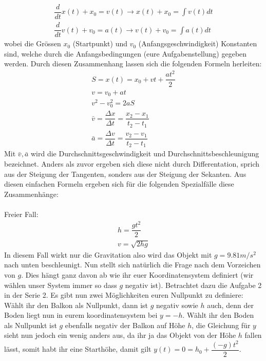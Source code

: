 \documentclass[12pt]{article}
\begin{document}
\begin{equation}
\begin{split}
\dfrac{d}{dt} x(t) + x_0 = v(t) \rightarrow x(t) + x_0 = \int v(t) dt \\
\dfrac{d}{dt} v(t)+v_0 = a(t) \rightarrow v(t)+v_0 = \int a(t) dt
\end{split}
\end{equation}
wobei die Grössen $x_0$ (Startpunkt) und $v_0$ (Anfangsgeschwindigkeit) Konstanten sind, welche durch die Anfangsbedingungen (eure Aufgabenstellung) gegeben werden. Durch diesen Zusammenhang lassen sich die folgenden Formeln herleiten:
\begin{equation}
\begin{split}
S = x(t) = x_0 + vt+\dfrac{at^2}{2} \\
v = v_0 + at \\
v^2-v_0^2 = 2aS \\
\bar{v} = \dfrac{\Delta x}{\Delta t} = \dfrac{x_2-x_1}{t_2-t_1} \\
\bar{a} = \dfrac{\Delta v}{\Delta t} = \dfrac{v_2-v_1}{t_2-t_1}
\end{split}
\end{equation}
Mit $\bar{v}, \bar{a}$ wird die Durchschnittsgeschwindigkeit und Durchschnittsbeschleunigung bezeichnet. Anders als zuvor ergeben sich diese nicht durch Differentation, sprich aus der Steigung der Tangenten, sonders aus der Steigung der Sekanten.
Aus diesen einfachen Formeln ergeben sich für die folgenden Spezialfälle diese Zusammenhänge:\\
\\ Freier Fall:
\begin{equation}
\begin{split}
h = \dfrac{gt^2}{2} \\
v = \sqrt{2hg}
\end{split}
\end{equation}
In diesem Fall wirkt nur die Gravitation also wird das Objekt mit $g = 9.81 m/s^2$ nach unten beschleunigt. Nun stellt sich natürlich die Frage nach dem Vorzeichen von $g$. Dies hängt ganz davon ab wie ihr euer Koordinatensystem definiert  (wir wählen unser System immer so dass $g$ negativ ist). Betrachtet dazu die Aufgabe 2 in der Serie 2. Es gibt nun zwei Möglichkeiten euren Nullpunkt zu definiere: Wählt ihr den Balkon als Nullpunkt, dann ist $g$ negativ sowie $h$ auch, denn der Boden liegt nun in eurem koordinatensystem bei $y=-h$. Wählt ihr den Boden als Nullpunkt ist $g$ ebenfalls negativ der Balkon auf Höhe $h$, die Gleichung für $y$ sieht nun jedoch ein wenig anders aus, da ihr ja das Objekt von der Höhe $h$ fallen lässt, somit habt ihr eine Starthöhe, damit gilt $y(t) = 0 = h_0+\dfrac{(-g)t^2}{2}$.\\
\end{document}
